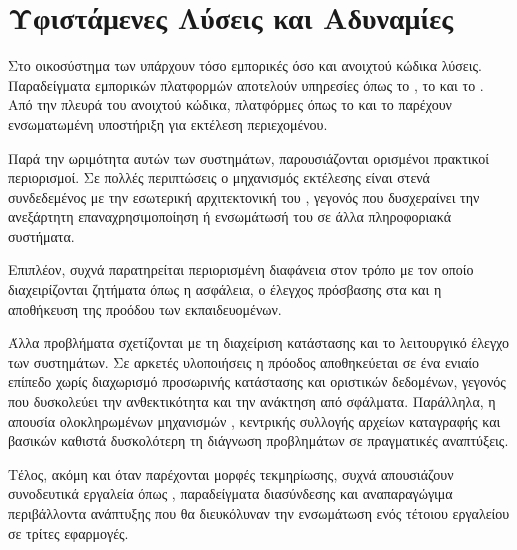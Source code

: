 \section{Υφιστάμενες Λύσεις και Αδυναμίες}

Στο οικοσύστημα των  υπάρχουν τόσο εμπορικές όσο και ανοιχτού κώδικα λύσεις. Παραδείγματα
εμπορικών πλατφορμών αποτελούν υπηρεσίες όπως το , το 
και το . Από την πλευρά του ανοιχτού κώδικα, πλατφόρμες όπως το  και το
 παρέχουν ενσωματωμένη υποστήριξη για εκτέλεση  περιεχομένου.

Παρά την ωριμότητα αυτών των συστημάτων, παρουσιάζονται ορισμένοι πρακτικοί περιορισμοί. Σε πολλές περιπτώσεις
ο μηχανισμός εκτέλεσης  είναι στενά συνδεδεμένος με την εσωτερική αρχιτεκτονική του ,
γεγονός που δυσχεραίνει την ανεξάρτητη επαναχρησιμοποίηση ή ενσωμάτωσή του σε άλλα πληροφοριακά συστήματα.

Επιπλέον, συχνά παρατηρείται περιορισμένη διαφάνεια στον τρόπο με τον οποίο διαχειρίζονται ζητήματα όπως η
ασφάλεια, ο έλεγχος πρόσβασης στα  και η αποθήκευση της προόδου των
εκπαιδευομένων.

Άλλα προβλήματα σχετίζονται με τη διαχείριση κατάστασης και το λειτουργικό έλεγχο των συστημάτων.
Σε αρκετές υλοποιήσεις η πρόοδος αποθηκεύεται σε ένα ενιαίο επίπεδο χωρίς διαχωρισμό προσωρινής κατάστασης και
οριστικών δεδομένων, γεγονός που δυσκολεύει την ανθεκτικότητα και την ανάκτηση από σφάλματα. Παράλληλα,
η απουσία ολοκληρωμένων μηχανισμών , κεντρικής συλλογής αρχείων καταγραφής και βασικών
 καθιστά δυσκολότερη τη διάγνωση προβλημάτων σε πραγματικές αναπτύξεις.

Τέλος, ακόμη και όταν παρέχονται μορφές τεκμηρίωσης, συχνά απουσιάζουν συνοδευτικά εργαλεία όπως
, παραδείγματα διασύνδεσης και αναπαραγώγιμα περιβάλλοντα ανάπτυξης που θα διευκόλυναν την
ενσωμάτωση ενός τέτοιου εργαλείου σε τρίτες εφαρμογές.